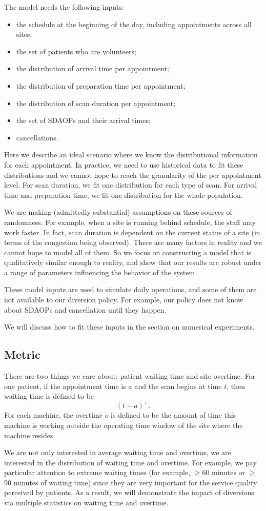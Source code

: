 The model needs the following inputs:
\begin{itemize}
\item the schedule at the beginning of the day, including
      appointments across all sites;
\item the set of patients who are volunteers;
\item the distribution of arrival time per appointment;
\item the distribution of preparation time per appointment;
\item the distribution of scan duration per appointment;
\item the set of SDAOPs and their arrival times;
\item cancellations.
\end{itemize}
Here we describe an ideal scenario where we know the distributional
information for each appointment. In practice, we need to
use historical data to fit these distributions and we cannot
hope to reach the granularity of the per appointment level.
For scan duration, we fit one distribution for each type of scan.
For arrival time and preparation time, we fit one distribution
for the whole population. 

We are making (admittedly substantial) assumptions on these sources of randomness.
For example, when a site is running behind schedule, the staff
may work faster. In fact, scan duration is dependent on the current status
of a site (in terms of the congestion being observed).
There are many factors in reality and we cannot
hope to model all of them. So we focus on constructing a model
that is qualitatively similar enough to reality, and show that our
results are robust under a range of parameters influencing the
behavior of the system.

These model inputs are used to simulate daily operations, and
some of them are not available to our diversion policy.
For example, our policy does not know about SDAOPs and cancellation
until they happen.

We will discuss how to fit these inputs in the section on
numerical experiments.

\subsection{Metric}

There are two things we care about: patient waiting time and
site overtime. For one patient, if the appointment time is $a$
and the scan begins at time $t$, then waiting time is defined
to be
\[  (t - a)^+. \]
For each machine, the overtime $o$ is defined to be the amount of
time this machine is working outside the operating time window
of the site where the machine resides.

We are not only interested in average waiting time and
overtime, we are interested in the distribution of waiting time
and overtime. For example, we pay particular attention to extreme
waiting times (for example, $\ge$60 minutes or $\ge$90 minutes of waiting time)
since they are very important for the service quality perceived by patients.
As a result, we will demonstrate the impact of diversions via
multiple statistics on waiting time and overtime.
